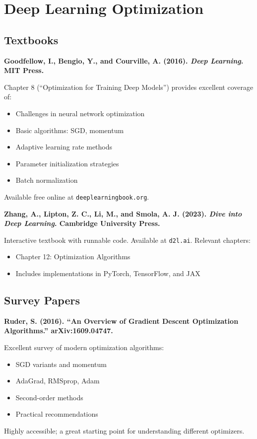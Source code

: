 \documentclass[../main.tex]{subfiles}
\begin{document}
\section{Deep Learning Optimization}

\subsection{Textbooks}

\textbf{Goodfellow, I., Bengio, Y., and Courville, A. (2016). \emph{Deep Learning}. MIT Press.}

Chapter 8 (``Optimization for Training Deep Models'') provides excellent coverage of:
\begin{itemize}
    \item Challenges in neural network optimization
    \item Basic algorithms: SGD, momentum
    \item Adaptive learning rate methods
    \item Parameter initialization strategies
    \item Batch normalization
\end{itemize}
Available free online at \texttt{deeplearningbook.org}.

\textbf{Zhang, A., Lipton, Z. C., Li, M., and Smola, A. J. (2023). \emph{Dive into Deep Learning}. Cambridge University Press.}

Interactive textbook with runnable code. Available at \texttt{d2l.ai}. Relevant chapters:
\begin{itemize}
    \item Chapter 12: Optimization Algorithms
    \item Includes implementations in PyTorch, TensorFlow, and JAX
\end{itemize}

\subsection{Survey Papers}

\textbf{Ruder, S. (2016). ``An Overview of Gradient Descent Optimization Algorithms.'' arXiv:1609.04747.}

Excellent survey of modern optimization algorithms:
\begin{itemize}
    \item SGD variants and momentum
    \item AdaGrad, RMSprop, Adam
    \item Second-order methods
    \item Practical recommendations
\end{itemize}
Highly accessible; a great starting point for understanding different optimizers.
\end{document}

